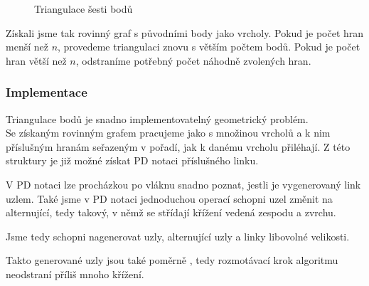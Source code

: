 \begin{figure}[h]  
\centering 
{}
\caption{Triangulace šesti bodů}
\end{figure}  

Získali jsme tak rovinný graf s původními body jako vrcholy. Pokud je počet hran menší než $n$, provedeme triangulaci znovu s větším počtem bodů. Pokud je počet hran větší než $n$, odstraníme potřebný počet náhodně zvolených hran.

\subsubsection{Implementace}

Triangulace bodů je snadno implementovatelný geometrický problém. \\ Se získaným rovinným grafem pracujeme jako s množinou vrcholů a k nim příslušným hranám seřazeným v pořadí, jak k danému vrcholu přiléhají. Z této struktury je již možné získat PD notaci příslušného linku.


V PD notaci lze procházkou po vláknu snadno poznat, jestli je vygenerovaný link uzlem. Také jsme v PD notaci jednoduchou operací schopni uzel změnit na alternující, tedy takový, v němž se střídají křížení vedená zespodu a zvrchu.

Jsme tedy schopni nagenerovat uzly, alternující uzly a linky libovolné velikosti.

Takto generované uzly jsou také poměrně , tedy rozmotávací krok algoritmu neodstraní příliš mnoho křížení.

